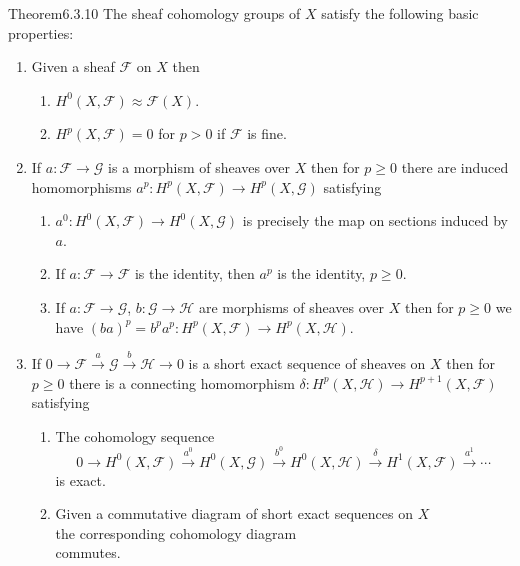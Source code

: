 \begin{originaltheorem}{Theorem}{6.3.10}
The sheaf cohomology groups of $X$ satisfy the following basic properties:
\begin{enumerate}
\item Given a sheaf $\mathcal F$ on $X$ then
\begin{enumerate}[label=\Alph*)]
\item $H^0(X,\mathcal F)\approx\mathcal F(X)$.
\item $H^p(X,\mathcal F)=0$ for $p>0$ if $\mathcal F$ is fine.
\end{enumerate}
\item If $a:\mathcal F\to\mathcal G$ is a morphism of sheaves over $X$ then for $p\geq0$ there are induced homomorphisms $a^p:H^p(X,\mathcal F)\to H^p(X,\mathcal G)$ satisfying
\begin{enumerate}[label=\Alph*)]
\item $a^0:H^0(X,\mathcal F)\to H^0(X,\mathcal G)$ is precisely the map on sections induced by $a$.
\item If $a:\mathcal F\to\mathcal F$ is the identity, then $a^p$ is the identity, $p\geq0$.
\item If $a:\mathcal F\to\mathcal G$, $b:\mathcal G\to\mathcal H$ are morphisms of sheaves over $X$ then for $p\geq0$ we have $(ba)^p=b^pa^p:H^p(X,\mathcal F)\to H^p(X,\mathcal H)$.
\end{enumerate}
\item If $0\to\mathcal F\xrightarrow a\mathcal G\xrightarrow b\mathcal H\to0$ is a short exact sequence of sheaves on $X$ then for $p\geq0$ there is a connecting homomorphism $\delta:H^p(X,\mathcal H)\to H^{p+1}(X,\mathcal F)$ satisfying
\begin{enumerate}[label=\Alph*)]
\item The cohomology sequence
\[
0\to H^0(X,\mathcal F)\xrightarrow{a^0}H^0(X,\mathcal G)\xrightarrow{b^0}H^0(X,\mathcal H)\xrightarrow\delta H^1(X,\mathcal F)\xrightarrow{a^1}\cdots
\]
is exact.
\item Given a commutative diagram of short exact sequences on $X$
\[

\]
the corresponding cohomology diagram
\begingroup\small
\[

\]
commutes.
\endgroup
\end{enumerate}
\end{enumerate}
\end{originaltheorem}
